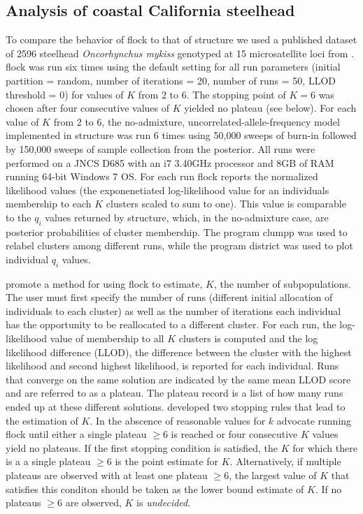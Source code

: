 \subsection*{Analysis of coastal California steelhead} 
To compare the behavior of {\sc flock} to that of {\sc structure} we used a published 
dataset of 2596 steelhead \textit{Oncorhynchus mykiss}
genotyped at 15 microsatellite loci from \citet{Garzaetal_norcal}.  {\sc flock} 
was run six times using the default setting for all 
run parameters (initial partition = random, number of iterations = 20, number of runs = 50, 
LLOD threshold = 0) for values of $K$ from 2 to 6. The stopping point of 
$K=6$ was chosen after four consecutive values of $K$
yielded no plateau (see below). For each value of $K$ from 2 to 6, the no-admixture, 
uncorrelated-allele-frequency model implemented in {\sc structure} was run 6 times using 
50,000 sweeps of burn-in followed by 150,000 sweeps of sample collection from the posterior. 
All runs were performed on a JNCS D685 with an i7 3.40GHz processor and 8GB
of RAM running 64-bit Windows 7 OS. For each run {\sc flock} reports the 
normalized likelihood values (the exponenetiated log-likelihood value for an individuals 
membership to each $K$ clusters scaled to sum to one). 
This value is comparable to the $q_i$ values
returned by {\sc structure}, which, in the no-admixture case, are posterior probabilities of cluster membership.
The program {\sc clumpp} \citep{Jak&Ros2007} was used to relabel clusters among different runs,
while the program {\sc district} \citep{Rosenberg2004} was used to plot individual \textit{$q_i$} values. 

\citet{Duc&Tur2012} promote a method for using {\sc flock} to estimate, $K$, the number of
subpopulations. The user must first specify the number of runs (different initial allocation of individuals 
to each cluster) as well as the number of iterations each individual has the opportunity to be reallocated 
to a different cluster. For each run, the log-likelihood value of membership to all $K$ clusters is computed
and the log likelihood difference (LLOD), the difference between the cluster with the highest likelihood 
and second highest likelihood, is reported for each individual. Runs that converge on the same solution 
are indicated by the same mean LLOD score and 
are referred to as a plateau. The plateau record is a list of how many runs ended up at these different solutions. 
\citet{Duc&Tur2012} developed two stopping rules that lead to the estimation of $K$. In the abscence of 
reasonable values for $k$ \citet{Duc&Tur2012} advocate running  {\sc flock} until either a single plateau 
$\geq 6$  is reached or four consecutive $K$ values yield no plateaus. If the first stopping condition is satisfied,
the $K$ for which there is a a single plateau $\geq 6$ is the point estimate for $K$. Alternatively, 
if multiple plateaus are observed with at least one plateau $\geq 6$, the largest value of $K$ that satisfies 
this conditon should be taken as the lower bound estimate of $K$. If no plateaus $\geq 6$ are observed, $K$
is \textit{undecided}.  


